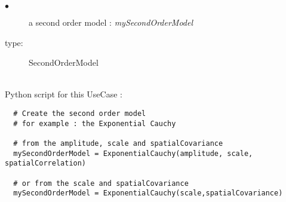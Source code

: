 {

  \begin{description}
  \item[$\bullet$] a second order model : {\itshape mySecondOrderModel}
  \item[type:] SecondOrderModel
  \end{description}
}

\textspace\\
Python script for this UseCase :

\begin{lstlisting}
  # Create the second order model
  # for example : the Exponential Cauchy

  # from the amplitude, scale and spatialCovariance
  mySecondOrderModel = ExponentialCauchy(amplitude, scale, spatialCorrelation)

  # or from the scale and spatialCovariance
  mySecondOrderModel = ExponentialCauchy(scale,spatialCovariance)
\end{lstlisting}
